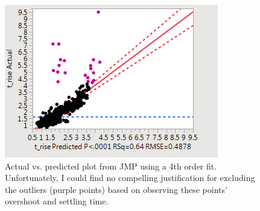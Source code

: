 \documentclass{article}
\begin{document}
\begin{figure}
	\centering
	\includegraphics[scale=0.5]{t_rise_actual_vs_predicted.png}
	\caption{Actual vs. predicted plot from JMP using a 4th order fit. Unfortunately, I could find no compelling justification for excluding the outliers (purple points) based on observing these points' overshoot and settling time.}
\end{figure}
\end{document}
